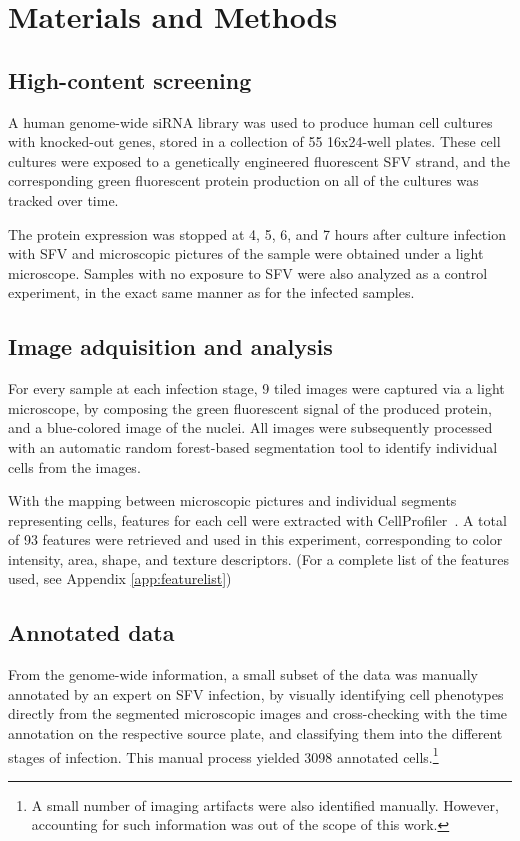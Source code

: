 \documentclass[oneside, a4paper, draft]{memoir} %
\begin{document}
\section{Materials and Methods}
\subsection{High-content screening}
A human genome-wide siRNA library was used to produce human cell cultures with knocked-out
genes, stored in a collection of 55 16x24-well plates.
These cell cultures were exposed to a genetically engineered fluorescent SFV strand, and the corresponding
green fluorescent protein production on all of the cultures was tracked over time.

The protein expression was stopped at 4, 5, 6, and 7 hours after culture infection with SFV and microscopic pictures
of the sample were obtained under a light microscope. Samples with no exposure to SFV were also analyzed as a control
experiment, in the exact same manner as for the infected samples.
\subsection{Image adquisition and analysis}
For every sample at each infection stage, 9 tiled images were captured via a light microscope, by composing the
green fluorescent signal of the produced protein, and a blue-colored image of the nuclei. All images were
subsequently processed with an automatic random forest-based segmentation  tool to identify individual cells from the images.

With the mapping between microscopic pictures and individual segments representing cells, features for each cell were
extracted with CellProfiler~\cite{carpenter2006cellprofiler}.
A total of 93 features were retrieved and used in this experiment, corresponding to color intensity, area, shape, and
texture descriptors. (For a complete list of the features used, see Appendix \ref{app:featurelist})

\subsection{Annotated data}
From the genome-wide information, a small subset of the data was manually annotated by an expert on SFV infection, by
visually identifying cell phenotypes directly from the segmented microscopic images and cross-checking with the time
annotation on the respective source plate, and classifying them into the different stages of infection. This manual
process yielded 3098 annotated cells.\footnote{A small number of imaging artifacts were also identified manually.
However, accounting for such information was out of the scope of this work.}
\end{document}
